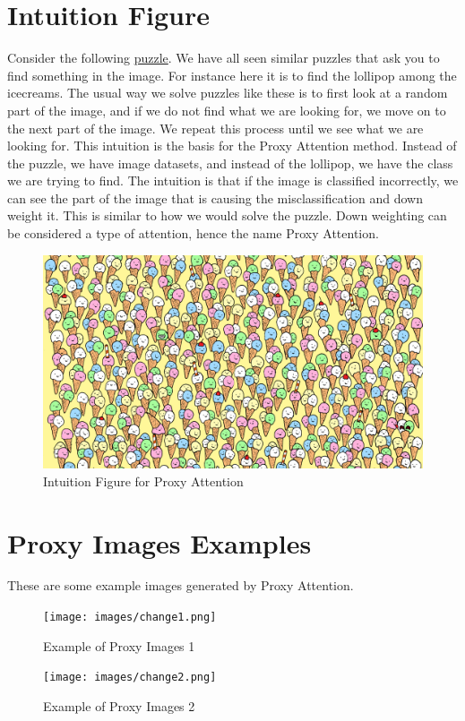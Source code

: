 \documentclass[a4paper,11pt,openright]{book}
\begin{document}
\section{Intuition Figure} \label{sec:intuition_figure}
Consider the following \href{https://www.thesun.co.uk/fabulous/15681738/brainteaser-lollipop-ice-cream/}{puzzle}. We have all seen similar puzzles that ask you to find something in the image. For instance here it is to find the lollipop
among the icecreams. 
The usual way we solve puzzles like these is to first look at a random part of the image, and if we do not find what we are looking for, we move on to the next part of the image. We repeat this process until we see what we are looking for. This intuition is the basis for the Proxy Attention method. Instead of the puzzle, we have image datasets, and instead of the lollipop, we have the class we are trying to find. The intuition is that if the image is classified incorrectly, we can see the part of the image that is causing the misclassification and down weight it. This is similar to how we would solve the puzzle. Down weighting can be considered a type of attention, hence the name Proxy Attention.
\begin{figure}[!htb]
    \centering
    \includegraphics[width=0.6\linewidth]{images/clutter.png}
    \caption{Intuition Figure for Proxy Attention}
    \label{fig:inti}
\end{figure}

\section{Proxy Images Examples} \label{sec:proxy_images_examples}
These are some example images generated by Proxy Attention.
\begin{figure}[!htb]
    \centering
    \texttt{[image: images/change1.png]}
    \caption{Example of Proxy Images 1}
\end{figure}

\begin{figure}[!htb]
    \centering
    \texttt{[image: images/change2.png]}
    \caption{Example of Proxy Images 2}
\end{figure}
\end{document}
